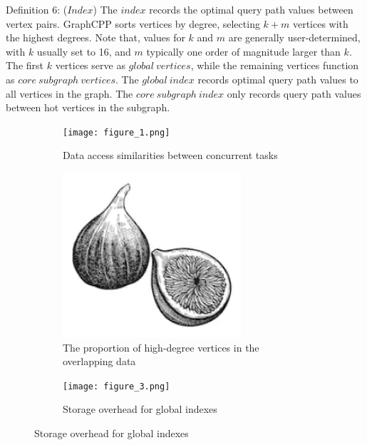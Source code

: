 \documentclass[lettersize,journal]{IEEEtran} %
\begin{document}
Definition 6: ($Index$) The $index$ records the optimal query path values between vertex pairs. GraphCPP sorts vertices by degree, selecting $k+m$ vertices with the highest degrees. Note that, values for $k$ and $m$ are generally user-determined, with $k$ usually set to 16, and $m$ typically one order of magnitude larger than $k$. The first $k$ vertices serve as $global~vertices$, while the remaining vertices function as $core~subgraph~vertices$. The $global~index$ records optimal query path values to all vertices in the graph. The $core~subgraph~index$ only records query path values between hot vertices in the subgraph.

\begin{figure}[!t]
    \centering
  
    \begin{subfigure}{0.3\columnwidth}
      \texttt{[image: figure\_1.png]}
      \caption{Data access similarities between concurrent tasks}
      \label{fig:subfig1}
    \end{subfigure}
    \hfill
    \begin{subfigure}{0.3\columnwidth}
      \includegraphics[width=\linewidth]{fig1.png}
      \caption{The proportion of high-degree vertices in the overlapping data}
      \label{fig:subfig2}
    \end{subfigure}
    \hfill
    \begin{subfigure}{0.3\columnwidth}
      \texttt{[image: figure\_3.png]}
      \caption{Storage overhead for global indexes}
      \label{fig:subfig3}
    \end{subfigure}
  

\end{figure}
\end{document}
